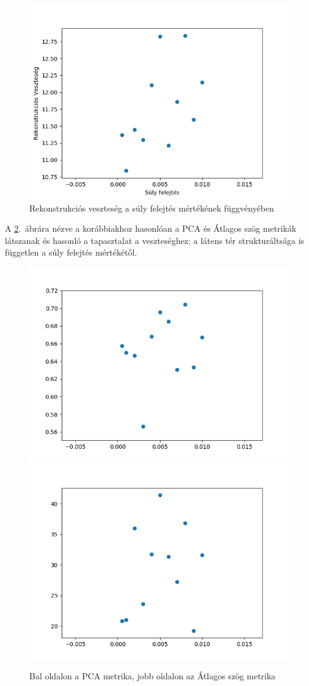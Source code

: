 \begin{figure}[h!]
\begin{center}
  
  \includegraphics[width=0.75\linewidth]{metrics/vae_wd-loss.png}
  \caption{Rekonstrukciós veszteség a súly felejtés mértékének függvényében}\label{wd-loss}
\end{center}
\end{figure}

A \ref{wd-metrics}.~ábrára nézve a korábbiakhoz hasonlóan a PCA és Átlagos szög metrikák látszanak és hasonló a tapasztalat a veszteséghez: a látens tér strukturáltsága is független a súly felejtés mértékétől.

\begin{figure}[h!]
  
  \includegraphics[width=0.5\linewidth]{vae_wd-pca.png}
  \includegraphics[width=0.5\linewidth]{vae_wd-as.png}
  \caption{Bal oldalon a PCA metrika, jobb oldalon az Átlagos szög metrika}\label{wd-metrics}
\end{figure}


